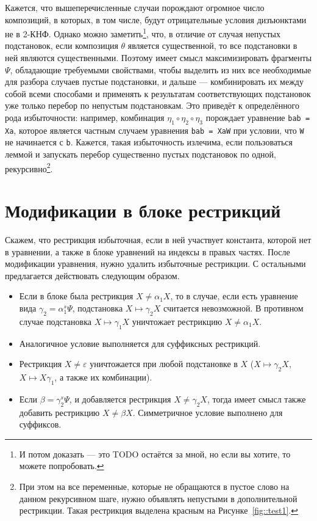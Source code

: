 \documentclass[12pt]{article}
\begin{document}
Кажется, что вышеперечисленные случаи порождают огромное число композиций, в которых, в том числе, будут отрицательные условия дизъюнктами не в 2-КНФ. Однако можно заметить\footnote{И потом доказать --- это TODO остаётся за мной, но если вы хотите, то можете попробовать.}, что, в отличие от случая непустых подстановок, если композиция $\theta$ является существенной, то все подстановки в ней являются существенными. Поэтому имеет смысл максимизировать фрагменты $\Psi$, обладающие требуемыми свойствами, чтобы выделить из них все необходимые для разбора случаев пустые подстановки, и дальше --- комбинировать их между собой всеми способами и применять к результатам соответствующих подстановок уже только перебор по непустым подстановкам. Это приведёт к определённого рода избыточности: например, комбинация $\eta_1\circ\eta_2\circ\eta_3$ порождает уравнение \verb|bab = Xa|, которое является частным случаем уравнения \verb|bab = XaW|  при условии, что \verb|W| не начинается с \verb|b|. Кажется, такая избыточность излечима, если пользоваться леммой и запускать перебор существенно пустых подстановок по одной, рекурсивно\footnote{При этом на все переменные, которые не обращаются в пустое слово на данном рекурсивном шаге, нужно объявлять непустыми в дополнительной рестрикции. Такая рестрикция выделена красным на Рисунке~\ref{fig::test1}.}.
 
\section{Модификации в блоке рестрикций} 

Скажем, что рестрикция избыточная, если в ней участвует константа, которой нет в уравнении, а также в блоке уравнений на индексы в правых частях. После модификации уравнения, нужно удалить избыточные рестрикции. С остальными предлагается действовать следующим образом.

\begin{itemize}
\item Если в блоке была рестрикция $X\neq \alpha_1 X$, то в случае, если есть уравнение вида $\gamma_2 = \alpha_1^{s}\Psi$, подстановка $X\mapsto \gamma_2 X$ считается невозможной. В противном случае подстановка $X\mapsto \gamma_1 X$ уничтожает рестрикцию $X\neq \alpha_1 X$.
\item Аналогичное условие выполняется для суффиксных рестрикций.
\item Рестрикция $X\neq\varepsilon$ уничтожается при любой подстановке в $X$ ($X\mapsto \gamma_2 X$, $X\mapsto X \gamma_1$, а также их комбинации).
\item Если $\beta = \gamma_2^{s}\Psi$, и добавляется рестрикция $X\neq \gamma_2 X$, тогда имеет смысл также добавить рестрикцию $X\neq \beta X$. Симметричное условие выполнено для суффиксов. 
\end{itemize}
 
\end{document}
